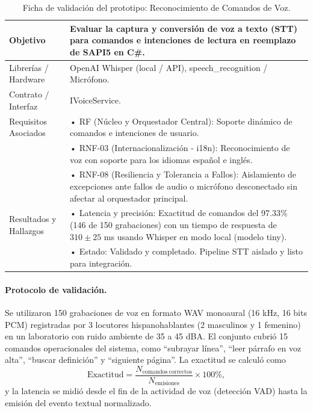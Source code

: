 \begin{table}[H]
    \centering
    \caption{Ficha de validación del prototipo: Reconocimiento de Comandos de Voz.}
    \label{tab:ficha_f24}
    \begin{tabular}{L{3.2cm} L{11.0cm}}
        \toprule
        Objetivo & Evaluar la captura y conversión de voz a texto (STT) para comandos e intenciones de lectura en reemplazo de SAPI5 en C\#. \\ \midrule
        Librerías / Hardware & OpenAI Whisper (local / API), speech\_recognition / Micrófono. \\ \midrule
        Contrato / Interfaz & IVoiceService. \\ \midrule
        Requisitos Asociados &
        • RF (Núcleo y Orquestador Central): Soporte dinámico de comandos e intenciones de usuario. \vspace{0.1cm} \\
        & • RNF-03 (Internacionalización - i18n): Reconocimiento de voz con soporte para los idiomas español e inglés. \vspace{0.1cm} \\
        & • RNF-08 (Resiliencia y Tolerancia a Fallos): Aislamiento de excepciones ante fallos de audio o micrófono desconectado sin afectar al orquestador principal. \\ \midrule
        Resultados y Hallazgos &
        • Latencia y precisión: Exactitud de comandos del 97.33\% (146 de 150 grabaciones) con un tiempo de respuesta de $310 \pm 25$ ms usando Whisper en modo local (modelo tiny). \vspace{0.1cm} \\
        & • Estado: Validado y completado. Pipeline STT aislado y listo para integración. \\ \bottomrule
    \end{tabular}
\end{table}
 
\paragraph{Protocolo de validación.} Se utilizaron 150 grabaciones de voz en formato WAV monoaural (16 kHz, 16 bits PCM) registradas por 3 locutores hispanohablantes (2 masculinos y 1 femenino) en un laboratorio con ruido ambiente de 35 a 45 dBA. El conjunto cubrió 15 comandos operacionales del sistema, como ``subrayar línea'', ``leer párrafo en voz alta'', ``buscar definición'' y ``siguiente página''. La exactitud se calculó como
\[ \mathrm{Exactitud} = \frac{N_{\mathrm{comandos\ correctos}}}{N_{\mathrm{emisiones}}} \times 100\%, \]
y la latencia se midió desde el fin de la actividad de voz (detección VAD) hasta la emisión del evento textual normalizado.
 
